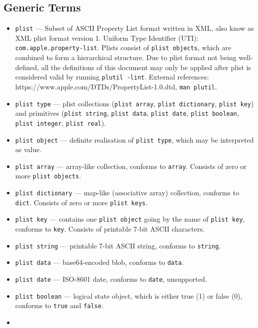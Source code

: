 \documentclass[]{article}
\makeatletter
\renewcommand{\label}[1]{%
\zref@wrapper@immediate{\oldlabel{#1}}}  %
\makeatother
\begin{document}
\subsection{Generic Terms}\label{generic-terms}

\begin{itemize}
\item
  \texttt{plist} --- Subset of ASCII Property List format written in
  XML, also know as XML plist format version 1. Uniform Type Identifier
  (UTI): \texttt{com.apple.property-list}. Plists consist of
  \texttt{plist\ objects}, which are combined to form a hierarchical
  structure. Due to plist format not being well-defined, all the
  definitions of this document may only be applied after plist is
  considered valid by running \texttt{plutil\ -lint}. External
  references: https://www.apple.com/DTDs/PropertyList-1.0.dtd,
  \texttt{man\ plutil}.
\item
  \texttt{plist\ type} --- plist collections (\texttt{plist\ array},
  \texttt{plist\ dictionary}, \texttt{plist\ key}) and primitives
  (\texttt{plist\ string}, \texttt{plist\ data}, \texttt{plist\ date},
  \texttt{plist\ boolean}, \texttt{plist\ integer},
  \texttt{plist\ real}).
\item
  \texttt{plist\ object} --- definite realisation of
  \texttt{plist\ type}, which may be interpreted as value.
\item
  \texttt{plist\ array} --- array-like collection, conforms to
  \texttt{array}. Consists of zero or more \texttt{plist\ objects}.
\item
  \texttt{plist\ dictionary} --- map-like (associative array)
  collection, conforms to \texttt{dict}. Consists of zero or more
  \texttt{plist\ keys}.
\item
  \texttt{plist\ key} --- contains one \texttt{plist\ object} going by
  the name of \texttt{plist\ key}, conforms to \texttt{key}. Consists of
  printable 7-bit ASCII characters.
\item
  \texttt{plist\ string} --- printable 7-bit ASCII string, conforms to
  \texttt{string}.
\item
  \texttt{plist\ data} --- base64-encoded blob, conforms to
  \texttt{data}.
\item
  \texttt{plist\ date} --- ISO-8601 date, conforms to \texttt{date},
  unsupported.
\item
  \texttt{plist\ boolean} --- logical state object, which is either true
  (1) or false (0), conforms to \texttt{true} and \texttt{false}.
\item

\end{itemize}
\end{document}
